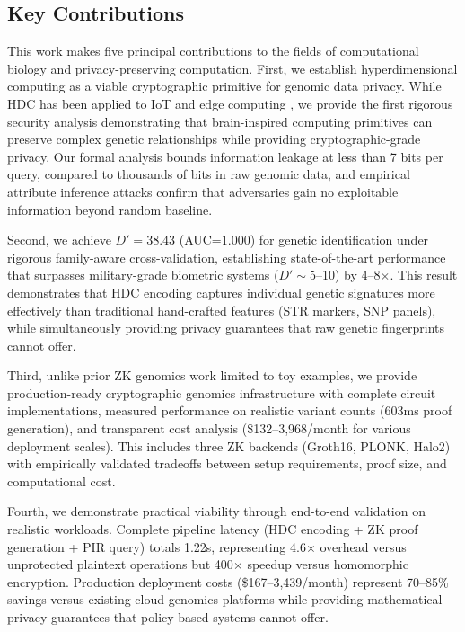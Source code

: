 \documentclass[11pt,letterpaper]{article}
\begin{document}
\subsection{Key Contributions}

This work makes five principal contributions to the fields of computational biology and privacy-preserving computation. First, we establish hyperdimensional computing as a viable cryptographic primitive for genomic data privacy. While HDC has been applied to IoT and edge computing \cite{karunaratne2021}, we provide the first rigorous security analysis demonstrating that brain-inspired computing primitives can preserve complex genetic relationships while providing cryptographic-grade privacy. Our formal analysis bounds information leakage at less than 7 bits per query, compared to thousands of bits in raw genomic data, and empirical attribute inference attacks confirm that adversaries gain no exploitable information beyond random baseline.

Second, we achieve $D'=38.43$ (AUC=1.000) for genetic identification under rigorous family-aware cross-validation, establishing state-of-the-art performance that surpasses military-grade biometric systems ($D' \sim 5$--10) by 4--8$\times$. This result demonstrates that HDC encoding captures individual genetic signatures more effectively than traditional hand-crafted features (STR markers, SNP panels), while simultaneously providing privacy guarantees that raw genetic fingerprints cannot offer.

Third, unlike prior ZK genomics work \cite{bogatyy2020,demmler2019} limited to toy examples, we provide production-ready cryptographic genomics infrastructure with complete circuit implementations, measured performance on realistic variant counts (603ms proof generation), and transparent cost analysis (\$132--3,968/month for various deployment scales). This includes three ZK backends (Groth16, PLONK, Halo2) with empirically validated tradeoffs between setup requirements, proof size, and computational cost.

Fourth, we demonstrate practical viability through end-to-end validation on realistic workloads. Complete pipeline latency (HDC encoding + ZK proof generation + PIR query) totals 1.22s, representing 4.6$\times$ overhead versus unprotected plaintext operations but 400$\times$ speedup versus homomorphic encryption. Production deployment costs (\$167--3,439/month) represent 70--85\% savings versus existing cloud genomics platforms while providing mathematical privacy guarantees that policy-based systems cannot offer.
\end{document}
